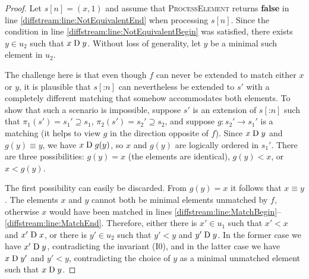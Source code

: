 \begin{proof}
  Let $s[n]=(x,1)$ and assume that \textsc{ProcessElement} returns
  \textbf{false} in line \ref{diffstream:line:NotEquivalentEnd} when processing $s[n]$.
  Since the condition in line \ref{diffstream:line:NotEquivalentBegin} was satisfied,
  there exists $y\in u_2$ such that $x\mathrel{\mathrm{D}} y$.
  Without loss of generality, let $y$ be a minimal such element in $u_2$.

  The challenge here is that even though $f$ can never be extended to match
  either $x$ or $y$, it is plausible that $s[\mathbin{:} n]$ can nevertheless be
  extended to $s'$ with a completely different matching that somehow accommodates both elements.
  To show that such a scenario is impossible, suppose
  $s'$ is an extension of $s[\mathbin{:} n]$ such that $\pi_1(s')=s_1'\supseteq s_1$, $\pi_2(s')=s_2'\supseteq s_2$, and suppose
  $g\colon s_2'\to s_1'$ is a matching (it helps to view $g$ in the direction opposite of $f$). Since $x \mathrel{\mathrm{D}} y$ and $g(y)\equiv y$, we have $x \mathrel{\mathrm{D}} g(y)$,
  so $x$ and $g(y)$ are logically ordered in $s_1'$. There are three possibilities:
  $g(y)=x$ (the elements are identical),
  $g(y)<x$, or $x<g(y)$.

  The first possibility can easily be discarded. From $g(y)=x$ it follows
  that $x\equiv y$. The elements $x$ and $y$ cannot both be minimal elements unmatched by $f$, otherwise $x$ would have been matched in lines
  \ref{diffstream:line:MatchBegin}--\ref{diffstream:line:MatchEnd}. Therefore, either there is
  $x'\in u_1$ such that $x'<x$ and $x'\mathrel{\mathrm{D}} x$, or there is $y'\in u_2$ such that
  $y'<y$ and $y'\mathrel{\mathrm{D}} y$. In the former case we have $x' \mathrel{\mathrm{D}} y$,
  contradicting the invariant (I0), and in the latter case we have
  $x \mathrel{\mathrm{D}} y'$ and $y'<y$, contradicting the choice of $y$ as a minimal
  unmatched element such that $x\mathrel{\mathrm{D}} y$.


\end{proof}
